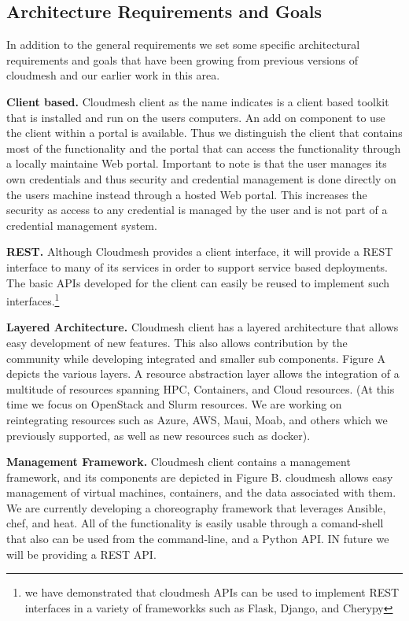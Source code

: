 \subsection{Architecture Requirements and Goals}

In addition to the general requirements we set some specific
architectural requirements and goals that have been growing from
previous versions of cloudmesh and our earlier work in this area.

\begin{description}

\item{\bf Client based.} Cloudmesh client as the name indicates is a
  client based toolkit that is installed and run on the users
  computers. An add on component to use the client within a portal is
  available. Thus we distinguish the client that contains most of the
  functionality and the portal that can access the functionality
  through a locally maintaine Web portal. Important to note is that
  the user manages its own credentials and thus security and
  credential management is done directly on the users machine instead
  through a hosted Web portal. This increases the security as access
  to any credential is managed by the user and is not part of a
  credential management system.

\item{\bf REST.} Although Cloudmesh provides a client interface, it
will provide a REST interface to many of its services in order to
support service based deployments. The basic APIs developed for the
client can easily be reused to implement such interfaces.\footnote{we
  have demonstrated that cloudmesh APIs can be used to implement REST
  interfaces in a variety of frameworkks such as Flask, Django, and Cherypy}

\item{\bf Layered Architecture.} Cloudmesh client has a layered
architecture that allows easy development of new features. This also
allows contribution by the community while developing integrated and
smaller sub components. Figure A depicts the various layers. A
resource abstraction layer allows the integration of a multitude of
resources spanning HPC, Containers, and Cloud resources. (At this time
we focus on OpenStack and Slurm resources. We are working on
reintegrating resources such as Azure, AWS, Maui, Moab, and others
which we previously supported, as well as new resources such as
docker).

\item{\bf Management Framework.} Cloudmesh client contains a
management framework, and its components are depicted in Figure
B. cloudmesh allows easy management of virtual machines, containers,
and the data associated with them. We are currently developing a
choreography framework that leverages Ansible, chef, and heat. All of
the functionality is easily usable through a comand-shell that also
can be used from the command-line, and a Python API. IN future we will
be providing a REST API.


\end{description}
